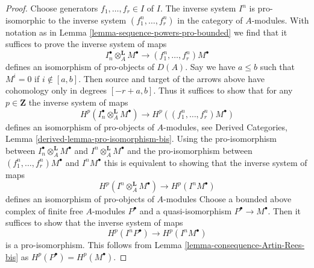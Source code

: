 \documentclass[10pt,a4paper]{amsart}
\theoremstyle{plain}
\theoremstyle{definition}
\theoremstyle{remark}
\numberwithin{equation}{subsection}
\begin{document}
\begin{proof}
Choose generators $f_1, \ldots, f_r \in I$ of $I$. The inverse system $I^n$
is pro-isomorphic to the inverse system $(f_1^n, \ldots, f_r^n)$
in the category of $A$-modules. With notation as in
Lemma \ref{lemma-sequence-powers-pro-bounded} we find that
it suffices to prove the inverse system of maps
$$
I_n^\bullet \otimes_A^\mathbf{L} M^\bullet
\longrightarrow
(f_1^n, \ldots, f_r^n)M^\bullet
$$
defines an isomorphism of pro-objects of $D(A)$.
Say we have $a \leq b$ such that $M^i = 0$ if $i \not \in [a, b]$.
Then source and target of the arrows above have cohomology
only in degrees $[-r + a, b]$.
Thus it suffices to show that for any $p \in \mathbf{Z}$ the
inverse system of maps
$$
H^p(I_n^\bullet \otimes_A^\mathbf{L} M^\bullet)
\longrightarrow
H^p((f_1^n, \ldots, f_r^n)M^\bullet)
$$
defines an isomorphism of pro-objects of $A$-modules, see
Derived Categories, Lemma \ref{derived-lemma-pro-isomorphism-bis}.
Using the pro-isomorphism between
$I_n^\bullet \otimes_A^\mathbf{L} M^\bullet$
and $I^n \otimes_A^\mathbf{L} M^\bullet$
and the pro-isomorphism between
$(f_1^n, \ldots, f_r^n)M^\bullet$ and $I^nM^\bullet$
this is equivalent to showing that the inverse system of maps
$$
H^p(I^n \otimes_A^\mathbf{L} M^\bullet)
\longrightarrow
H^p(I^nM^\bullet)
$$
defines an isomorphism of pro-objects of $A$-modules
Choose a bounded above complex of finite free $A$-modules
$P^\bullet$ and a quasi-isomorphism $P^\bullet \to M^\bullet$.
Then it suffices to show that the inverse system of maps
$$
H^p(I^nP^\bullet)
\longrightarrow
H^p(I^nM^\bullet)
$$
is a pro-isomorphism. This follows from
Lemma \ref{lemma-consequence-Artin-Rees-bis}
as $H^p(P^\bullet) = H^p(M^\bullet)$.
\end{proof}
\end{document}
